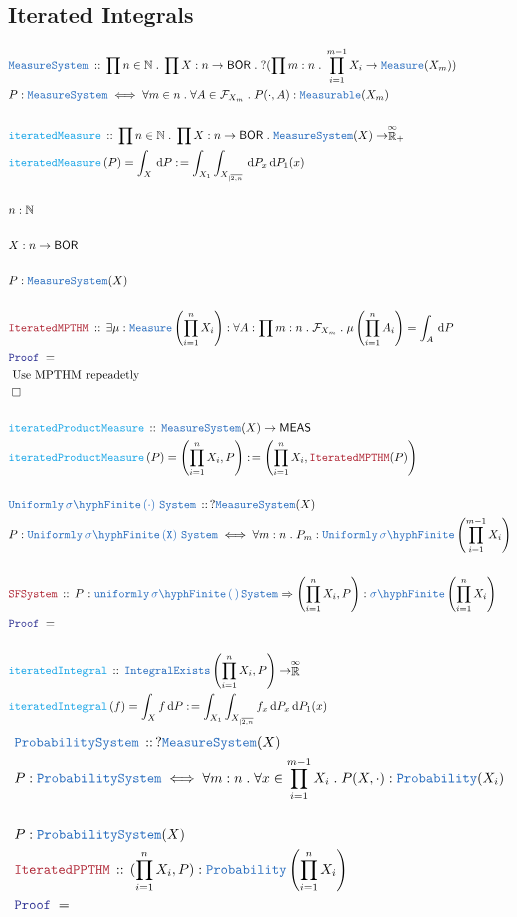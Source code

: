 \documentclass[12pt]{scrartcl}
\newcommand{\TYPE}[1]{\textcolor{NavyBlue}{\mathtt{#1}}}
\newcommand{\FUNC}[1]{\textcolor{Cerulean}{\mathtt{#1}}}
\newcommand{\LOGIC}[1]{\textcolor{Blue}{\mathtt{#1}}}
\newcommand{\THM}[1]{\textcolor{Maroon}{\mathtt{#1}}}
\renewcommand{\.}{\; . \;}
\newcommand{\de}{: \kern 0.1pc =}
\newcommand{\Act}[1]{\left( #1 \right)}
\newcommand{\Theorem}[2]{& \THM{#1} \, :: \, #2 \\ & \Proof = \\ }
\newcommand{\DeclareType}[2]{& \TYPE{#1} \, :: \, #2 \\}
\newcommand{\DefineType}[3]{& #1 : \TYPE{#2} \iff #3 \\}
\newcommand{\DeclareFunc}[2]{& \FUNC{#1} \, :: \, #2 \\}
\newcommand{\DefineNamedFunc}[4]{&  \FUNC{#1}\Act{#2} = #3 \de #4 \\}
\newcommand{\Nat}{\mathbb{N} }
\newcommand{\EReals}{\stackrel{\mathclap{\infty}}{\mathbb{R}}}
\newcommand{\QED}{\; \square}
\newcommand{\EndProof}{& \QED \\}
\newcommand{\Proof}{\LOGIC{Proof} \; }
\newcommand{\SF}[1]{\TYPE{\sigma \hyph  Finite}\left( #1 \right) }
\newcommand{\BOR}{\mathsf{BOR}}
\newcommand{\MEAS}{\mathsf{MEAS}}
\newcommand{\F}{\mathcal{F}}
\begin{document}
\subsection{Iterated Integrals}
\begin{align*}
\DeclareType{MeasureSystem}{ \prod n \in \Nat \. \prod X : n \to \BOR \. ?( \prod m : n \. \prod^{m -1}_{i = 1} X_i \to  \TYPE{Measure}(X_m)   )   }
\DefineType{ P  }{ \TYPE{MeasureSystem} }{ \forall  m  \in n \. \forall A \in \F_{X_m} \. P( \cdot, A) : \TYPE{Measurable}(X_m)  }
\\
\DeclareFunc{iteratedMeasure}{ \prod n \in \Nat \. \prod X : n \to \BOR \. \TYPE{MeasureSystem}(X) \to \EReals_+  }
\DefineNamedFunc{iteratedMeasure}{ P }{ \int_X \, \mathrm{d}P }{ \int_{X_1} \int_{X_{|\overline{2,n}}}\, \mathrm{d}P_x \, \mathrm{d}P_1(x) }
\\
& n : \Nat
\\ \\
& X : n \to \BOR
\\ \\
& P : \TYPE{MeasureSystem}(X)
\\ \\
\Theorem{IteratedMPTHM}{ 
 \exists \mu : \TYPE{Measure}\left( \prod^n_{i = 1} X_i \right) : \forall A : \prod m : n \. \F_{X_m} \. \mu \left( \prod^n_{i = 1} A_i  \right) = \int_A \, \mathrm{d} P
}        
& \text{ Use MPTHM repeadetly  } \\
\EndProof
\\
\DeclareFunc{ iteratedProductMeasure }{ \TYPE{MeasureSystem}(X) \to \MEAS }
\DefineNamedFunc{ \FUNC{iteratedProductMeasure } }{P}{ \left( \prod^n_{i = 1} X_i , P\right) }{ \left( \prod^n_{i = 1} X_i, \THM{IteratedMPTHM}(P)    \right) }
\\
\DeclareType{ Uniformly \, \SF{\cdot} \, System  }{?\TYPE{MeasureSystem}(X)}
\DefineType{ P  }{ Uniformly \, \SF{X} \, System }{  \forall m : n \. P_m : \TYPE{Uniformly} \, \SF{ \prod^{m - 1}_{i = 1} X_i }  }
\\
\Theorem{ SFSystem}{ P : \TYPE{uniformly \, \SF \, System} \Rightarrow  \left( \prod^n_{i = 1} X_i, P \right) : \SF{  \prod^n_{i = 1} X_i } }
\\
\DeclareFunc{ iteratedIntegral}{ \TYPE{IntegralExists}\left( \prod^n_{i = 1} X_i, P \right) \to \EReals  }
\DefineNamedFunc{ iteratedIntegral }{ f }{ \int_X f \, \mathrm{d}P }{ \int_{X_1} \int_{X_{|\overline{2,n}}} f_x \, \mathrm{d}P_x \, \mathrm{d}P_1(x)  }
\end{align*}
\newpage
\begin{align*}
 \DeclareType{ProbabilitySystem}{ ? \TYPE{MeasureSystem}(X) }
 \DefineType{P}{ProbabilitySystem}{ \forall m : n \. \forall x \in \prod^{m -1}_{i = 1} X_i \. P(X, \cdot)  : \TYPE{Probability}(X_i) }
\\
& P : \TYPE{ProbabilitySystem}(X)   
\\
\Theorem{IteratedPPTHM}{ ( \prod^n_{i = 1} X_i, P) : \TYPE{Probability}\left( \prod^n_{i = 1} X_i   \right)    }
\end{align*} 
\newpage
\end{document}
